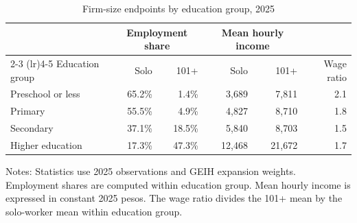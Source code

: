 \begin{table}[htbp]
  \centering
  \caption{Firm-size endpoints by education group, 2025}
  \label{tab:descriptive-education-endpoints-2025}
  \small
  \begin{tabular}{lrrrrr}
    \toprule
    & \multicolumn{2}{c}{Employment share} & \multicolumn{2}{c}{Mean hourly income} & \\
    \cmidrule(lr){2-3} \cmidrule(lr){4-5}
    Education group & Solo & 101+ & Solo & 101+ & Wage ratio \\
    \midrule
    Preschool or less & 65.2\% & 1.4\% & 3,689 & 7,811 & 2.1 \\
    Primary & 55.5\% & 4.9\% & 4,827 & 8,710 & 1.8 \\
    Secondary & 37.1\% & 18.5\% & 5,840 & 8,703 & 1.5 \\
    Higher education & 17.3\% & 47.3\% & 12,468 & 21,672 & 1.7 \\
    \bottomrule
  \end{tabular}
  \vspace{0.3em}
  \begin{minipage}{0.95\textwidth}
  \footnotesize
  Notes: Statistics use 2025 observations and GEIH expansion weights. Employment shares are computed within education group. Mean hourly income is expressed in constant 2025 pesos. The wage ratio divides the 101+ mean by the solo-worker mean within education group.
  \end{minipage}
\end{table}
